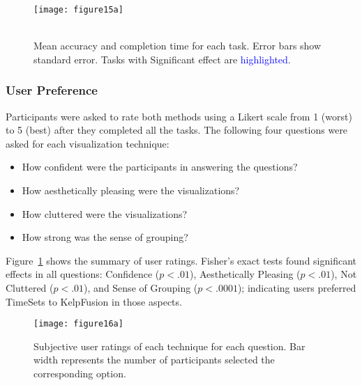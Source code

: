 \begin{figure}[!htb]
	\centering
	 {\texttt{[image: figure15a]}} \\
	\\
	\caption{Mean accuracy and completion time for each task. Error bars show standard error. Tasks with Significant effect are \textcolor{blue}{highlighted}.}
\end{figure}

\subsubsection{User Preference}
Participants were asked to rate both methods using a Likert scale from 1 (worst) to 5 (best) after they completed all the tasks. The following four questions were asked for each visualization technique: 
\begin{itemize}
	\item How confident were the participants in answering the questions? 
	\item How aesthetically pleasing were the visualizations? 
	\item How cluttered were the visualizations?
	\item How strong was the sense of grouping?
\end{itemize}
Figure~\ref{fig:ratings} shows the summary of user ratings. Fisher's exact tests found significant effects in all questions: Confidence ($p<.01$), Aesthetically Pleasing ($p<.01$), Not Cluttered ($p<.01$), and Sense of Grouping ($p<.0001$); indicating users preferred TimeSets to KelpFusion in those aspects.

\begin{figure}[!htb]
	\centering
	 {
		\texttt{[image: figure16a]}}
	\caption{Subjective user ratings of each technique for each question. Bar width represents the number of participants selected the corresponding option.}
	\label{fig:ratings}
\end{figure}

